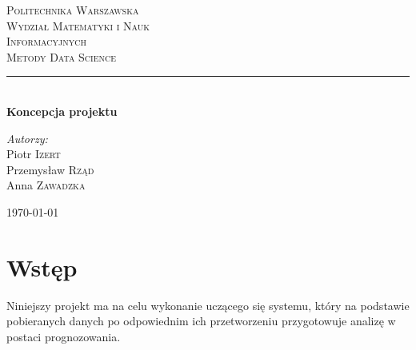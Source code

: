 \documentclass{article}
\begin{document}
	
\begin{titlepage}

\newcommand{\HRule}{\rule{\linewidth}{0.5mm}}

\center


\textsc{\LARGE Politechnika Warszawska}\\[10mm]
\textsc{\LARGE Wydział Matematyki i Nauk}\\[4mm]
\textsc{\LARGE Informacyjnych}\\[4cm]
 

\textsc{\Huge Metody Data Science}\\[0.5cm]


\HRule \\[0.4cm]
{ \LARGE \bfseries Koncepcja projektu}\\[5.0cm]
 
 

\begin{flushright}
\Large \emph{Autorzy:}\\[0.5cm]
Piotr \textsc{Izert}\\
Przemysław \textsc{Rząd}\\
Anna \textsc{Zawadzka}\\
\end{flushright}


\vfill
{\large \today}\\[3cm]

\end{titlepage}
	
\newpage

\section{Wstęp}

Niniejszy projekt ma na celu wykonanie uczącego się systemu, który na podstawie pobieranych danych po odpowiednim ich przetworzeniu przygotowuje analizę w postaci prognozowania.
\end{document}
